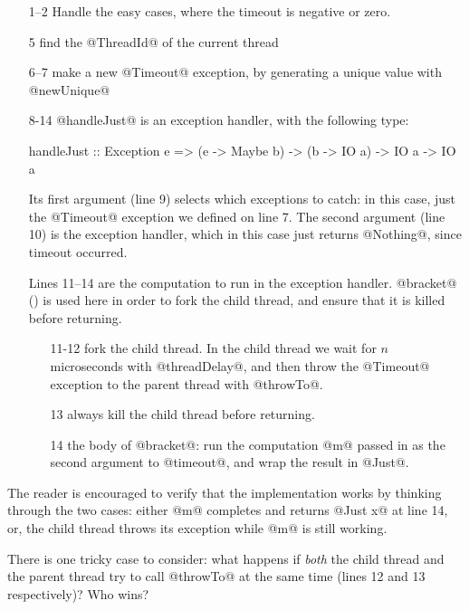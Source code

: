 \begin{itemize}
\item[1--2] Handle the easy cases, where the timeout is
  negative or zero.
\item[5] find the @ThreadId@ of the current thread
\item[6--7] make a new @Timeout@ exception, by generating a unique value
  with @newUnique@
\item[8-14] @handleJust@ is an exception handler, with the following
  type:
\begin{haskell}
handleJust :: Exception e
           => (e -> Maybe b) -> (b -> IO a) -> IO a
           -> IO a
\end{haskell}
  Its first argument (line 9) selects which exceptions to catch: in
  this case, just the @Timeout@ exception we defined on line 7.  The
  second argument (line 10) is the exception handler, which in this
  case just returns @Nothing@, since timeout occurred.

  Lines 11--14 are the computation to run in the exception handler.
  @bracket@ () is used here in order to fork
  the child thread, and ensure that it is killed before returning.

  \begin{itemize}
    \item[11-12] fork the child thread.  In the child thread we wait
      for $n$ microseconds with @threadDelay@, and then throw the
      @Timeout@ exception to the parent thread with @throwTo@.
    \item [13] always kill the child thread before returning.
    \item [14] the body of @bracket@: run the computation @m@ passed
      in as the second argument to @timeout@, and wrap the result in
      @Just@.
  \end{itemize}
\end{itemize}

The reader is encouraged to verify that the implementation works by
thinking through the two cases: either @m@ completes and returns
@Just x@ at line 14, or, the child thread throws its exception while
@m@ is still working.

There is one tricky case to consider: what happens if \emph{both} the
child thread and the parent thread try to call @throwTo@ at the same
time (lines 12 and 13 respectively)?  Who wins?

